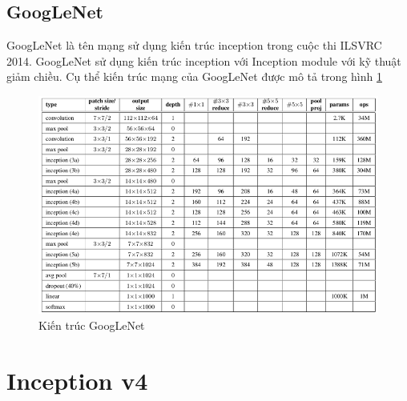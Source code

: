 \documentclass[a4paper,12pt]{report}
\begin{document}
\subsection{GoogLeNet}
GoogLeNet là tên mạng sử dụng kiến trúc inception trong cuộc thi ILSVRC 2014. GoogLeNet sử dụng kiến trúc inception với Inception module với kỹ thuật giảm chiều. Cụ thể kiến trúc mạng của GoogLeNet được mô tả trong hình \ref{fig_googLeNet}
\begin{figure}[H]
\centering 
\includegraphics[scale=0.65]{googLeNet.png}
\caption{Kiến trúc GoogLeNet}
\label{fig_googLeNet}
\end{figure}

\section{Inception v4 \cite{rethinking} \cite{inceptionv4}}
\end{document}
